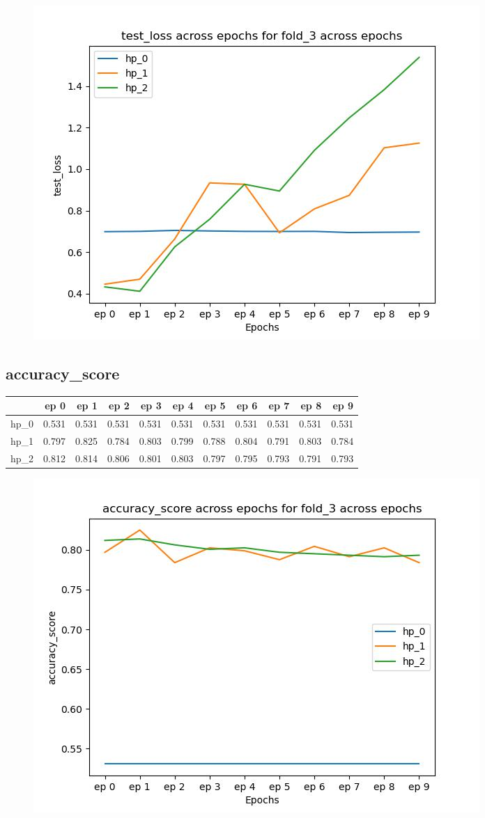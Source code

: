 \documentclass{article}
\begin{document}
\begin{figure}[H]
\includegraphics[scale = 0.75]{fold_3/test_loss}
\end{figure}
\subsection{accuracy\_score}
\begin{tabular}{lrrrrrrrrrr}
\toprule
{} &   ep 0 &   ep 1 &   ep 2 &   ep 3 &   ep 4 &   ep 5 &   ep 6 &   ep 7 &   ep 8 &   ep 9 \\
\midrule
hp\_0 &  0.531 &  0.531 &  0.531 &  0.531 &  0.531 &  0.531 &  0.531 &  0.531 &  0.531 &  0.531 \\
hp\_1 &  0.797 &  0.825 &  0.784 &  0.803 &  0.799 &  0.788 &  0.804 &  0.791 &  0.803 &  0.784 \\
hp\_2 &  0.812 &  0.814 &  0.806 &  0.801 &  0.803 &  0.797 &  0.795 &  0.793 &  0.791 &  0.793 \\
\bottomrule
\end{tabular}

\begin{figure}[H]
\includegraphics[scale = 0.75]{fold_3/accuracy_score}
\end{figure}
\end{document}
